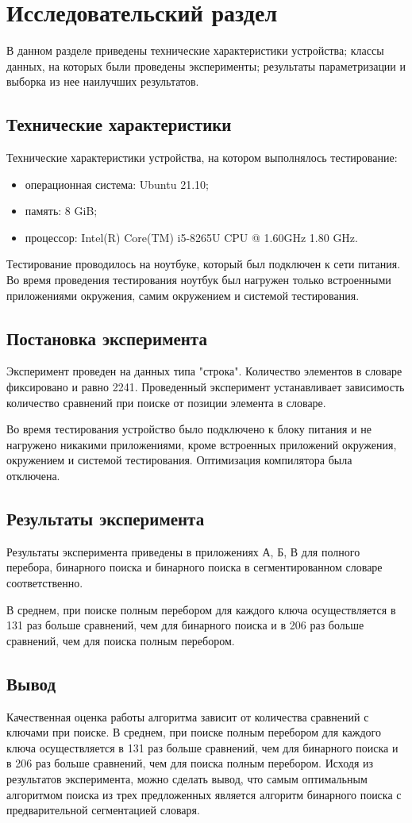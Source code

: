 \chapter{Исследовательский раздел}
В данном разделе приведены технические характеристики устройства; классы данных, на которых были проведены эксперименты; результаты параметризации и выборка из нее наилучших результатов.
 
\section{Технические характеристики}
Технические характеристики устройства, на котором выполнялось тестирование:
\begin{itemize}
	\item операционная система: Ubuntu 21.10;
	\item память: 8 GiB;
	\item процессор: Intel(R) Core(TM) i5-8265U CPU @ 1.60GHz   1.80 GHz.
\end{itemize}
Тестирование проводилось на ноутбуке, который был подключен к сети питания. Во время проведения тестирования ноутбук был нагружен только встроенными приложениями окружения, самим окружением и системой тестирования.

\section{Постановка эксперимента}
Эксперимент проведен на данных типа "строка". Количество элементов в словаре фиксировано и равно 2241. Проведенный эксперимент устанавливает зависимость количество сравнений при поиске от позиции элемента в словаре.

Во время тестирования устройство было подключено к блоку питания и не нагружено никакими приложениями, кроме встроенных приложений окружения, окружением и системой тестирования. Оптимизация компилятора была отключена.

\section{Результаты эксперимента}
Результаты эксперимента приведены в приложениях А, Б, В для полного перебора, бинарного поиска и бинарного поиска в сегментированном словаре соответственно. 

В среднем, при поиске полным перебором для каждого ключа осуществляется в 131 раз больше сравнений, чем для бинарного поиска и в 206 раз больше сравнений, чем для поиска полным перебором. 

\section{Вывод}\label{sec:exp-sum}
Качественная оценка работы алгоритма зависит от количества сравнений с ключами при поиске. В среднем, при поиске полным перебором для каждого ключа осуществляется в 131 раз больше сравнений, чем для бинарного поиска и в 206 раз больше сравнений, чем для поиска полным перебором. Исходя из результатов эксперимента, можно сделать вывод, что самым оптимальным алгоритмом поиска из трех предложенных является алгоритм бинарного поиска с предварительной сегментацией словаря.